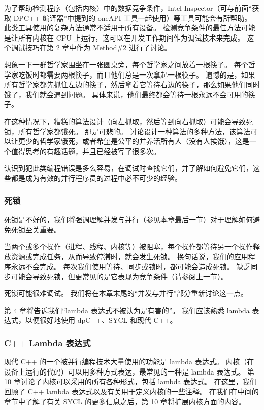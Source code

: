 为了帮助检测程序（包括内核）中的数据竞争条件，Intel Inspector（可与前面“获取 DPC++ 编译器”中提到的 oneAPI 工具一起使用）等工具可能会有所帮助。 此类工具使用的复杂方法通常不适用于所有设备。 检测竞争条件的最佳方法可能是让所有内核在 CPU 上运行，这可以在开发工作期间作为调试技术来完成。 这个调试技巧在第 2 章中作为 Method\#2 进行了讨论。

\begin{remark}
想象一下一群哲学家围坐在一张圆桌旁，每个哲学家之间放着一根筷子。 每个哲学家吃饭时都需要两根筷子，而且他们总是一次拿起一根筷子。 遗憾的是，如果所有哲学家都先抓住左边的筷子，然后拿着它等待右边的筷子，那么如果他们同时饿了，我们就会遇到问题。 具体来说，他们最终都会等待一根永远不会可用的筷子。

在这种情况下，糟糕的算法设计（向左抓取，然后等到向右抓取）可能会导致死锁，所有哲学家都饿死。 那是可悲的。 讨论设计一种算法的多种方法，该算法可以让更少的哲学家饿死，或者希望是公平的并养活所有人（没有人挨饿），这是一个值得思考的有趣话题，并且已经被写了很多次。

认识到犯此类编程错误是多么容易，在调试时查找它们，并了解如何避免它们，这些都是成为有效的并行程序员的过程中必不可少的经验。
\end{remark}

\subsubsection{死锁}
死锁是不好的，我们将强调理解并发与并行（参见本章最后一节）对于理解如何避免死锁至关重要。

当两个或多个操作（进程、线程、内核等）被阻塞，每个操作都等待另一个操作释放资源或完成任务，从而导致停滞时，就会发生死锁。 换句话说，我们的应用程序永远不会完成。 每次我们使用等待、同步或锁时，都可能会造成死锁。 缺乏同步可能会导致死锁，但更常见的是它表现为竞争条件（请参阅上一节）。

死锁可能很难调试。 我们将在本章末尾的“并发与并行”部分重新讨论这一点。

\begin{remark}
	第 4 章将告诉我们“lambda 表达式不被认为是有害的”。 我们应该熟悉 lambda 表达式，以便很好地使用 dpC++、SYCL 和现代 C++。
\end{remark}

\subsubsection{C++ Lambda 表达式}
现代 C++ 的一个被并行编程技术大量使用的功能是 lambda 表达式。 内核（在设备上运行的代码）可以用多种方式表达，最常见的一种是 lambda 表达式。 第 10 章讨论了内核可以采用的所有各种形式，包括 lambda 表达式。 在这里，我们回顾了 C++ lambda 表达式以及有关用于定义内核的一些注释。 在我们在中间的章节中了解了有关 SYCL 的更多信息之后，第 10 章将扩展内核方面的内容。

